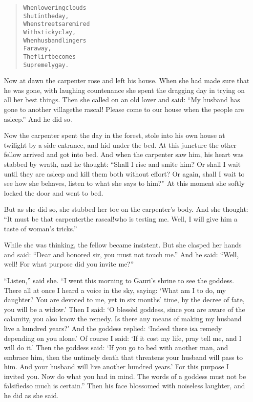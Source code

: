 \documentclass[article, twoside, 14pt]{memoir}
\renewenvironment{verbatim}{%
\begin{quote}%
\vskip -10pt%
\begin{alltt}\normalfont\large}{\end{alltt}%
\end{quote}%
\vskip -10pt
} %
\begin{document}
\begin{verbatim}
When lowering clouds
    Shut in the day,
When streets are mired
    With sticky clay,
When husband lingers
    Far away,
The flirt becomes
    Supremely gay.
\end{verbatim}
Now at dawn the carpenter rose and left his house. When she had
made sure that he was gone, with laughing countenance she spent the
dragging day in trying on all her best things. Then she called on
an old lover and said:
``My husband has gone to another village{\textemdash}the rascal! Please come to our house when the people are asleep.''
And he did so.

Now the carpenter spent the day in the forest, stole into his own
house at twilight by a side entrance, and hid under the bed. At
this juncture the other fellow arrived and got into bed. And
when the carpenter saw him, his heart was stabbed by wrath, and he
thought:
``Shall I rise and smite him? Or shall I wait until they are asleep and kill them both without effort? Or again, shall I wait to see how she behaves, listen to what she says to him?''
At this moment she softly locked the door and went to bed.

But as she did so, she stubbed her toe on the carpenter's body. And
she thought:
``It must be that carpenter{\textemdash}the rascal!{\textemdash}who is testing me. Well, I will give him a taste of woman's tricks.''

While she was thinking, the fellow became insistent. But she
clasped her hands and said:
``Dear and honored sir, you must not touch me.'' And he said:
``Well, well! For what purpose did you invite me?''

``Listen,'' said she.
``I went this morning to Gauri's shrine to see the goddess. There all at once I heard a voice in the sky, saying: `What am I to do, my daughter? You are devoted to me, yet in six months' time, by the decree of fate, you will be a widow.' Then I said: `O blessèd goddess, since you are aware of the calamity, you also know the remedy. Is there any means of making my husband live a hundred years?' And the goddess replied: `Indeed there is{\textemdash}a remedy depending on you alone.' Of course I said: `If it cost my life, pray tell me, and I will do it.' Then the goddess said: `If you go to bed with another man, and embrace him, then the untimely death that threatens your husband will pass to him. And your husband will live another hundred years.' For this purpose I invited you. Now do what you had in mind. The words of a goddess must not be falsified{\textemdash}so much is certain.''
Then his face blossomed with noiseless laughter, and he did
as she said.
\end{document}
